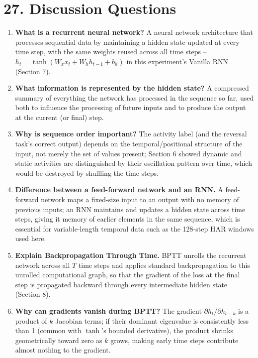 \documentclass[10pt]{article}
\begin{document}
\section*{27. Discussion Questions}

\begin{enumerate}

\item \textbf{What is a recurrent neural network?}
A neural network architecture that processes sequential data by maintaining
a hidden state updated at every time step, with the same weights reused
across all time steps -- $h_t=\tanh(W_xx_t+W_hh_{t-1}+b_h)$ in this
experiment's Vanilla RNN (Section 7).

\item \textbf{What information is represented by the hidden state?}
A compressed summary of everything the network has processed in the
sequence so far, used both to influence the processing of future inputs and
to produce the output at the current (or final) step.

\item \textbf{Why is sequence order important?}
The activity label (and the reversal task's correct output) depends on the
temporal/positional structure of the input, not merely the set of values
present; Section 6 showed dynamic and static activities are distinguished
by their oscillation pattern over time, which would be destroyed by
shuffling the time steps.

\item \textbf{Difference between a feed-forward network and an RNN.}
A feed-forward network maps a fixed-size input to an output with no memory
of previous inputs; an RNN maintains and updates a hidden state across time
steps, giving it memory of earlier elements in the same sequence, which is
essential for variable-length temporal data such as the 128-step HAR
windows used here.

\item \textbf{Explain Backpropagation Through Time.}
BPTT unrolls the recurrent network across all $T$ time steps and applies
standard backpropagation to this unrolled computational graph, so that the
gradient of the loss at the final step is propagated backward through every
intermediate hidden state (Section 8).

\item \textbf{Why can gradients vanish during BPTT?}
The gradient $\partial h_t/\partial h_{t-k}$ is a product of $k$ Jacobian
terms; if their dominant eigenvalue is consistently less than 1 (common
with $\tanh$'s bounded derivative), the product shrinks geometrically
toward zero as $k$ grows, making early time steps contribute almost nothing
to the gradient.


\end{enumerate}
\end{document}
